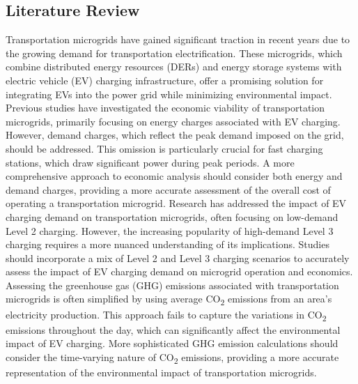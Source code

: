 \documentclass[conference]{IEEEtran}
\begin{document}
  	\subsection{Literature Review}
  		Transportation microgrids have gained significant traction in recent years due to the growing demand for transportation electrification. These microgrids, which combine distributed energy resources (DERs) and energy storage systems with electric vehicle (EV) charging infrastructure, offer a promising solution for integrating EVs into the power grid while minimizing environmental impact. Previous studies have investigated the economic viability of transportation microgrids, primarily focusing on energy charges associated with EV charging. However, demand charges, which reflect the peak demand imposed on the grid, should be addressed. This omission is particularly crucial for fast charging stations, which draw significant power during peak periods. A more comprehensive approach to economic analysis should consider both energy and demand charges, providing a more accurate assessment of the overall cost of operating a transportation microgrid. Research has addressed the impact of EV charging demand on transportation microgrids, often focusing on low-demand Level 2 charging. However, the increasing popularity of high-demand Level 3 charging requires a more nuanced understanding of its implications. Studies should incorporate a mix of Level 2 and Level 3 charging scenarios to accurately assess the impact of EV charging demand on microgrid operation and economics. Assessing the greenhouse gas (GHG) emissions associated with transportation microgrids is often simplified by using average CO\textsubscript{2} emissions from an area's electricity production. This approach fails to capture the variations in CO\textsubscript{2} emissions throughout the day, which can significantly affect the environmental impact of EV charging. More sophisticated GHG emission calculations should consider the time-varying nature of CO\textsubscript{2} emissions, providing a more accurate representation of the environmental impact of transportation microgrids. \\
  		
\end{document}

